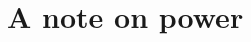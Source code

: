 \documentclass{imsart}
\newcommand{\norm}[1]{\lVert #1 \rVert}
\begin{document}



\section{A note on power}
\label{app:power}
\end{document}
